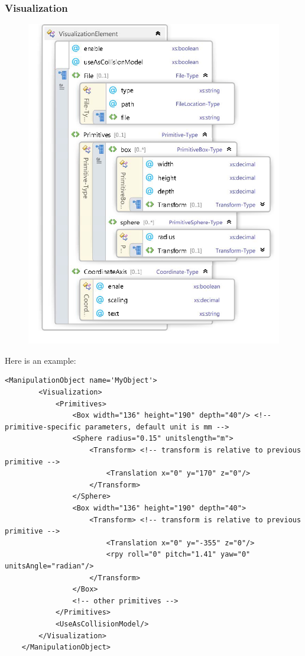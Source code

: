\documentclass{book}
\begin{document}
\subsubsection{Visualization}
\begin{figure}[H]
	\centering
	\includegraphics[scale = 0.3]{Visualization}
\end{figure}

Here is an example:
\begin{lstlisting}
<ManipulationObject name='MyObject'>
        <Visualization>
            <Primitives>
                <Box width="136" height="190" depth="40"/> <!-- primitive-specific parameters, default unit is mm -->
                <Sphere radius="0.15" unitslength="m">
                    <Transform> <!-- transform is relative to previous primitive -->
                        <Translation x="0" y="170" z="0"/>
                    </Transform>
                </Sphere>
                <Box width="136" height="190" depth="40">
                    <Transform> <!-- transform is relative to previous primitive -->
                        <Translation x="0" y="-355" z="0"/>
                        <rpy roll="0" pitch="1.41" yaw="0" unitsAngle="radian"/>
                    </Transform>
                </Box>
                <!-- other primitives -->
            </Primitives>
            <UseAsCollisionModel/>
        </Visualization>
    </ManipulationObject>
\end{lstlisting}
\end{document}
